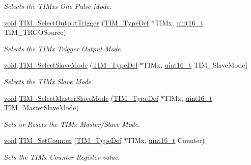 \begin{DoxyCompactItemize}
\begin{DoxyCompactList}\small\item\em Selects the T\+I\+Mx\textquotesingle{}s One Pulse Mode. \end{DoxyCompactList}\item 
\hyperlink{usb__devapi_8h_afabf60e7f57651d6d595a02c75f07cd0}{void} \hyperlink{group___t_i_m___private___functions_ga28745aaa549e2067e42c19569209e6c6}{T\+I\+M\+\_\+\+Select\+Output\+Trigger} (\hyperlink{struct_t_i_m___type_def}{T\+I\+M\+\_\+\+Type\+Def} $\ast$T\+I\+Mx, \hyperlink{_p_e___types_8h_a1f1825b69244eb3ad2c7165ddc99c956}{uint16\+\_\+t} T\+I\+M\+\_\+\+T\+R\+G\+O\+Source)
\begin{DoxyCompactList}\small\item\em Selects the T\+I\+Mx Trigger Output Mode. \end{DoxyCompactList}\item 
\hyperlink{usb__devapi_8h_afabf60e7f57651d6d595a02c75f07cd0}{void} \hyperlink{group___t_i_m___private___functions_ga2f19ce1d90990691cf037e419ba08003}{T\+I\+M\+\_\+\+Select\+Slave\+Mode} (\hyperlink{struct_t_i_m___type_def}{T\+I\+M\+\_\+\+Type\+Def} $\ast$T\+I\+Mx, \hyperlink{_p_e___types_8h_a1f1825b69244eb3ad2c7165ddc99c956}{uint16\+\_\+t} T\+I\+M\+\_\+\+Slave\+Mode)
\begin{DoxyCompactList}\small\item\em Selects the T\+I\+Mx Slave Mode. \end{DoxyCompactList}\item 
\hyperlink{usb__devapi_8h_afabf60e7f57651d6d595a02c75f07cd0}{void} \hyperlink{group___t_i_m___private___functions_ga4dcc3d11b670c381d0ff9cb7e9fd01e2}{T\+I\+M\+\_\+\+Select\+Master\+Slave\+Mode} (\hyperlink{struct_t_i_m___type_def}{T\+I\+M\+\_\+\+Type\+Def} $\ast$T\+I\+Mx, \hyperlink{_p_e___types_8h_a1f1825b69244eb3ad2c7165ddc99c956}{uint16\+\_\+t} T\+I\+M\+\_\+\+Master\+Slave\+Mode)
\begin{DoxyCompactList}\small\item\em Sets or Resets the T\+I\+Mx Master/\+Slave Mode. \end{DoxyCompactList}\item 
\hyperlink{usb__devapi_8h_afabf60e7f57651d6d595a02c75f07cd0}{void} \hyperlink{group___t_i_m___private___functions_gaad2c31dc9c551b48f08b96ba49c4aa44}{T\+I\+M\+\_\+\+Set\+Counter} (\hyperlink{struct_t_i_m___type_def}{T\+I\+M\+\_\+\+Type\+Def} $\ast$T\+I\+Mx, \hyperlink{_p_e___types_8h_a1f1825b69244eb3ad2c7165ddc99c956}{uint16\+\_\+t} Counter)
\begin{DoxyCompactList}\small\item\em Sets the T\+I\+Mx Counter Register value. \end{DoxyCompactList}\item 

\end{DoxyCompactItemize}
